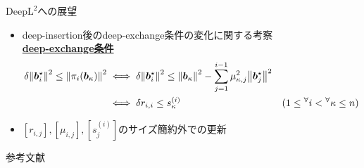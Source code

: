 \documentclass[12pt,aspectratio=169,table,dvipdfmx, leqno]{beamer}
\begin{document}
\begin{frame}{$\text{DeepL}^2$への展望}
\begin{itemize}
    \item deep-insertion後のdeep-exchange条件の変化に関する考察\\
    \underline{\textbf{deep-exchange条件}}
    \begin{align*}
        \delta \norm{\bm{b}_i^\star}^2\le \norm{\pi_i(\bm{b}_\kappa)}^2&\iff \delta \norm{\bm{b}_i^\star}^2\le \norm{\bm{b}_{\kappa}}^2-\sum_{j=1}^{i-1}\mu_{\kappa, j}^2\norm{\bm{b}_j^\star}^2&\\
        &\iff \delta r_{i, i}\le s_\kappa^{(i)}&(1\le {}^\forall i<{}^\forall\kappa\le n)
    \end{align*}
    \item $[r_{i, j}], [\mu_{i, j}], [s_j^{(i)}]$のサイズ簡約外での更新
\end{itemize}
\end{frame}

\begin{frame}[allowframebreaks]{参考文献}
\beamertemplatetextbibitems

\typeout{}

\end{frame}
\end{document}
